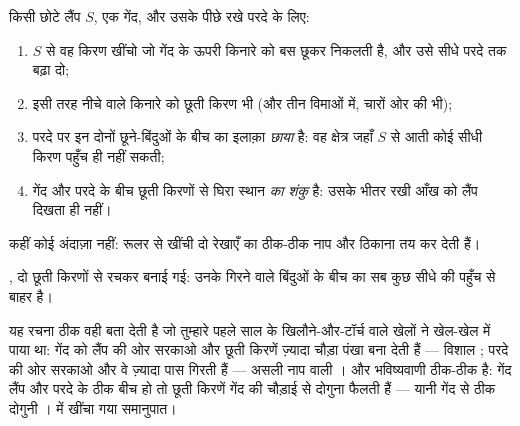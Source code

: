 \begin{method}[रूलर से छाया बनाना]\label{met:g6:light-propagation:shadow}
किसी छोटे लैंप $S$, एक गेंद, और उसके पीछे रखे परदे के लिए:
\begin{enumerate}
  \item $S$ से वह किरण खींचो जो गेंद के ऊपरी किनारे को बस छूकर
        निकलती है, और उसे सीधे परदे तक बढ़ा दो;
  \item इसी तरह नीचे वाले किनारे को छूती किरण भी (और तीन विमाओं में,
        चारों ओर की भी);
  \item परदे पर इन दोनों छूने-बिंदुओं के बीच का इलाक़ा
        \emph{छाया} है: वह क्षेत्र जहाँ $S$ से आती कोई
        सीधी किरण पहुँच ही नहीं सकती;
  \item गेंद और परदे के बीच छूती किरणों से घिरा स्थान \emph{ का
        शंकु} है: उसके भीतर रखी आँख को लैंप दिखता ही नहीं।
\end{enumerate}
कहीं कोई अंदाज़ा नहीं: रूलर से खींची दो रेखाएँ  का ठीक-ठीक नाप और
ठिकाना तय कर देती हैं।
\end{method}

\begin{omfigure}

{\small {}, दो छूती किरणों से रचकर बनाई गई: उनके गिरने वाले बिंदुओं
के बीच का सब कुछ सीधे  की पहुँच से बाहर है।}
\end{omfigure}

\begin{example}[बड़ी, छोटी, तीखी]\label{ex:g6:light-propagation:sizes}
यह रचना ठीक वही बता देती है जो तुम्हारे पहले साल के खिलौने-और-टॉर्च
वाले खेलों ने खेल-खेल में पाया था: गेंद को लैंप की ओर सरकाओ और छूती
किरणें ज़्यादा चौड़ा पंखा बना देती हैं --- विशाल ; परदे की ओर
सरकाओ और वे ज़्यादा पास गिरती हैं --- असली नाप वाली । और
भविष्यवाणी ठीक-ठीक है: गेंद लैंप और परदे के ठीक बीच हो तो छूती किरणें
गेंद की चौड़ाई से दोगुना फैलती हैं --- यानी गेंद से ठीक दोगुनी ।
 में खींचा गया समानुपात।
\end{example}

